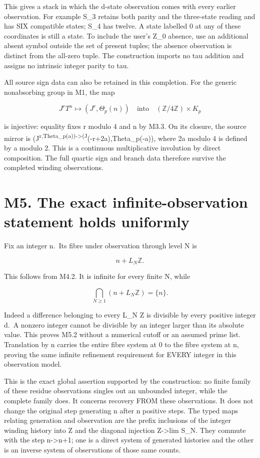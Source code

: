 This gives a stack in which the d-state observation comes with every
earlier observation. For example S\_3 retains both parity and the
three-state reading and has SIX compatible states; S\_4 has twelve. A
state labelled 0 at any of these coordinates is still a state. To
include the user's Z\_0 absence, use an additional absent symbol outside
the set of present tuples; the absence observation is distinct from the
all-zero tuple. The construction imports no tau addition and assigns no
intrinsic integer parity to tau.

All source sign data can also be retained in this completion. For the
generic nonabsorbing group in M1, the map

\[
J^rT^n\longmapsto(J^r,\Theta_p(n))
\quad\text{into}\quad (\mathbb Z/4\mathbb Z)\times K_p
\tag{M4.3}
\]

is injective: equality fixes r modulo 4 and n by M3.3. On its closure,
the source mirror is
(J\textsuperscript{r,Theta\_p(a))-\textgreater(J}(-r+2a),Theta\_p(-a)),
where 2a modulo 4 is defined by a modulo 2. This is a continuous
multiplicative involution by direct composition. The full quartic sign
and branch data therefore survive the completed winding observations.

\section{M5. The exact infinite-observation statement holds
uniformly}\label{m5.-the-exact-infinite-observation-statement-holds-uniformly}

Fix an integer n.~Its fibre under observation through level N is

\[
n+L_N\mathbb Z.
\tag{M5.1}
\]

This follows from M4.2. It is infinite for every finite N, while

\[
\bigcap_{N\ge1}(n+L_N\mathbb Z)=\{n\}.
\tag{M5.2}
\]

Indeed a difference belonging to every L\_N Z is divisible by every
positive integer d.~A nonzero integer cannot be divisible by an integer
larger than its absolute value. This proves M5.2 without a numerical
cutoff or an assumed prime list. Translation by n carries the entire
fibre system at 0 to the fibre system at n, proving the same infinite
refinement requirement for EVERY integer in this observation model.

This is the exact global assertion supported by the construction: no
finite family of these residue observations singles out an unbounded
integer, while the complete family does. It concerns recovery FROM these
observations. It does not change the original step generating n after n
positive steps. The typed maps relating generation and observation are
the prefix inclusions of the integer winding history into Z and the
diagonal injection Z-\textgreater lim S\_N. They commute with the step
n-\textgreater n+1; one is a direct system of generated histories and
the other is an inverse system of observations of those same counts.

